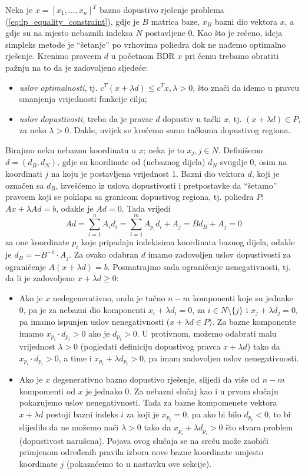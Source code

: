 \documentclass[a4paper, utf8, 11pt, colorlinks]{book}
\begin{document}
 Neka je $x = [x_1,\ldots, x_n]^T$ bazno dopustivo rješenje problema (\ref{eq:lp_equality_constraint}), gdje je $B$ matrica baze, $x_B$ bazni dio vektora $x$, a gdje su na mjesto nebaznih indeksa $N$ postavljene 0.  Kao što je rečeno, ideja simpleks metode je  ``šetanje'' po vrhovima poliedra  dok ne nađemo optimalno rješenje. Krenimo pravcem $d$ u  početnom BDR $x$  pri čemu trebamo obratiti  pažnju na to da je zadovoljeno sljedeće:
\begin{itemize}
    \item \emph{uslov optimalnosti}, tj. $c^T (x + \lambda d) \leq c^T x, \lambda>0$, što znači da idemo u pravcu smanjenja vrijednosti funkcije cilja;
    \item \emph{uslov dopustivosti}, treba da je pravac $d$ dopustiv u tački $x$, tj. $ (x + \lambda d) \in P$, za neko $\lambda>0$. Dakle, uvijek se krećemo samo tačkama dopustivog regiona. 
\end{itemize}
Birajmo neku nebaznu koordinatu u $x$; neka je to $x_j, j \in N$. Definišemo $d=(d_B,  d_N)$, gdje su koordinate od (nebaznog dijela) $d_N$ svugdje 0, osim na koordinati $j$ na koju je postavljena vrijednost 1.   Bazni dio vektora $d$, koji je označen sa $d_B$, izvešćemo iz uslova dopustivosti i pretpostavke da ``šetamo'' pravcem koji se poklapa sa granicom dopustivog regiona, tj. poliedra $P$: $Ax + \lambda Ad = b$, odakle je $Ad = 0$. Tada vrijedi
$$ Ad = \sum_{i=1}^n A_i d_i = \sum_{i=1}^m A_{p_i} d_i + A_j = B d_B + A_j = 0$$ za one koordinate $p_i$ koje pripadaju indekisima koordinata baznog dijela, 
odakle je $d_B = -  B^{-1} \cdot A_j $.  Za ovako odabran $d$ imamo zadovoljen uslov dopustivosti za ograničenje $A( x + \lambda d )  =b$. Posmatrajmo sada ograničenje nenegativnosti, tj. da li je zadovoljeno $x + \lambda d \geq 0$:
\begin{itemize}
    \item Ako je $x$ nedegenerativno, onda je tačno $n-m$ komponenti koje su jednake 0, pa je za nebazni dio komponenti $x_i + \lambda d_i = 0$, za $i \in N \setminus \{j\}$ i $x_j + \lambda d_j = 0$, pa imamo ispunjen uslov nenegativnosti ($x + \lambda d\in P$). Za bazne komponente imamo $x_{p_i} \cdot d_{p_i} > 0 $ ako je $d_{p_i}>0$. U protivnom, možemo odabrati  malu vrijednost  $\lambda>0$ (pogledati definiciju dopustivog pravca $x +\lambda d$) tako da $x_{p_i} \cdot d_{p_i} >0$, a time i $x_{p_i} + \lambda d_{p_i}>0$, pa imam zadovoljen uslov nenegativnosti.
    \item Ako je $x$ degenerativno bazno dopustivo rješenje, slijedi da više od $n-m$ kompomenti od $x$ je jednako 0. Za nebazni slučaj kao i u prvom slučaju pokazujemo uslov nenegativnosti. Tada za bazne kompomenete vektora $x +\lambda d$  postoji bazni indeks $i$ za koji je $x_{p_i} = 0$, pa ako bi bilo $d_{p_i}< 0$, to bi slijedilo da ne možemo naći $\lambda>0$ tako da $x_{p_i} + \lambda d_{p_i} >0$  što stvara problem (dopustivost narušena). Pojava ovog slučaja se na sreću može zaobići primjenom određenih pravila izbora nove bazne koordinate umjesto koordinate $j$ (pokazaćemo to u nastavku ove sekcije). 
\end{itemize}
\end{document}
